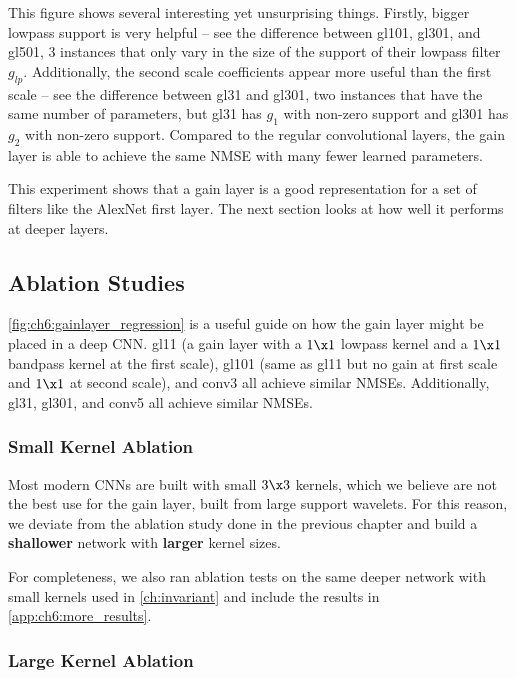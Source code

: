 This figure shows several interesting yet unsurprising things. Firstly,
bigger lowpass support is very helpful -- see the difference between gl101,
gl301, and gl501, 3 instances that only vary in the size of the support of their
lowpass filter $g_{lp}$. Additionally, the second scale coefficients appear more
useful than the first scale -- see the difference between gl31 and gl301, two
instances that have the same number of parameters, but gl31 has $g_1$ with
non-zero support and gl301 has $g_2$ with non-zero support. Compared to the regular convolutional
layers, the gain layer is able to achieve the same NMSE with many fewer learned parameters.

This experiment shows that a gain layer is a good representation for a set of
filters like the AlexNet first layer. The next section looks at how well it
performs at deeper layers.

\subsection{Ablation Studies}\label{sec:ch6:ablation}
\autoref{fig:ch6:gainlayer_regression} is a useful guide on how the gain layer
might be placed in a deep CNN. gl11 (a gain layer with a $1\x1$ lowpass kernel
and a $1\x1$ bandpass kernel at the first scale), gl101 (same as gl11 but no
gain at first scale and $1\x 1$ at second scale), and conv3 all achieve similar
NMSEs. Additionally, gl31, gl301, and conv5 all achieve similar NMSEs.

\subsubsection{Small Kernel Ablation}
Most modern CNNs are built with small $3\x 3$ kernels, which we believe are not the best
use for the gain layer, built from large support wavelets. For this reason, we
deviate from the ablation study done in the previous chapter and build a
\textbf{shallower} network with \textbf{larger} kernel sizes.

For completeness, we also ran ablation tests on the same deeper network
with small kernels used in \autoref{ch:invariant} and include the results in
\autoref{app:ch6:more_results}.

\renewcommand{\_}{\textscale{.6}{\textunderscore}}
\subsubsection{Large Kernel Ablation}


